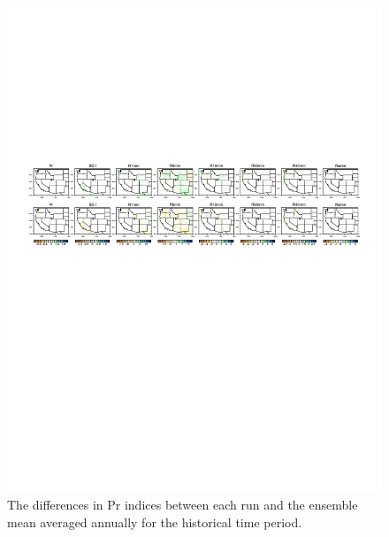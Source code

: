 \documentclass{ametsoc}
\begin{document}
\clearpage
 
 
\begin{figure}
\begin{center}
\includegraphics[width=6in]{wd_index_member_minus_ensembleMean_annual_Hist.pdf}
\caption{The differences in Pr indices between each run and the ensemble mean averaged annually for the historical time period.}
\label{fig:S1}
\end{center}
\end{figure}
\end{document}

